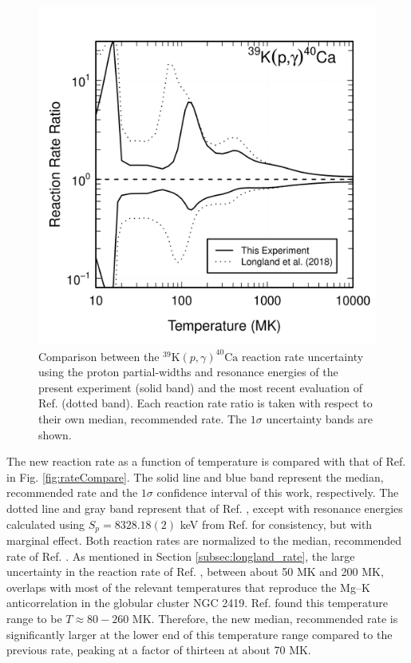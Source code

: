 \begin{figure}[!p]
\includegraphics[width=6.5in]{Chapter-6/figs/uncCompare.png} %
\caption{\label{fig:uncCompare}Comparison between the $^{39}\mathrm{K}(p, \gamma)^{40}\mathrm{Ca}$ reaction rate uncertainty using the proton partial-widths and resonance energies of the present experiment (solid band) and the most recent evaluation of Ref. \cite{Longland2018} (dotted band). Each reaction rate ratio is taken with respect to their own median, recommended rate. The $1\sigma$ uncertainty bands are shown.}
\end{figure}

The new reaction rate as a function of temperature is compared with that of Ref. \cite{Longland2018} in Fig. \ref{fig:rateCompare}. The solid line and blue band represent the median, recommended rate and the $1\sigma$ confidence interval of this work, respectively. The dotted line and gray band represent that of Ref. \cite{Longland2018}, except with resonance energies calculated using $S_{p} = 8328.18(2)$ keV from Ref. \cite{Wang2021} for consistency, but with marginal effect. Both reaction rates are normalized to the median, recommended rate of Ref. \cite{Longland2018}. As mentioned in Section \ref{subsec:longland_rate}, the large uncertainty in the reaction rate of Ref. \cite{Longland2018}, between about 50 MK and 200 MK, overlaps with most of the relevant temperatures that reproduce the Mg--K anticorrelation in the globular cluster NGC 2419. Ref. \cite{Iliadis2016} found this temperature range to be $T \approx 80-260$ MK. Therefore, the new median, recommended rate is significantly larger at the lower end of this temperature range compared to the previous rate, peaking at a factor of thirteen at about 70 MK. 

